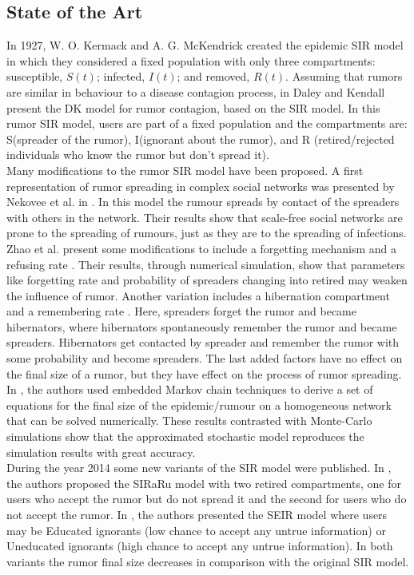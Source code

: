 \subsection{State of the Art}

In 1927, W. O. Kermack and A. G. McKendrick created the epidemic SIR model in which they considered a fixed population with only three compartments: susceptible, $S(t)$; infected, $I(t)$; and removed, $R(t)$. Assuming that rumors are similar in behaviour to a disease contagion process, in \cite{daley1965stochastic,daley1964epidemics} Daley and Kendall present the DK model for rumor contagion, based on the SIR model. In this rumor SIR model, users are part of a fixed population and the compartments are: S(spreader of the rumor), I(ignorant about the rumor), and R (retired/rejected individuals who know the rumor but don't spread it).\\

Many modifications to the rumor SIR model have been proposed. 
A first representation of rumor spreading in complex social networks was presented by Nekovee et al. in \cite{moreno2004dynamics,nekovee2007theory}. In this model the rumour spreads by contact of the spreaders with others in the network. 
Their results show that scale-free social networks are prone to the spreading of rumours, just as they are to the spreading of infections. Zhao et al. present some modifications to include a forgetting mechanism \cite{zhao2011rumor} and a refusing rate \cite{zhao2013sir}.
Their results, through numerical simulation, show that parameters like forgetting rate and probability of spreaders changing into retired may weaken the influence of rumor. 
Another variation includes a hibernation compartment \cite{zhao2012sihr} and a remembering rate \cite{zhao2013rumor}. 
Here, spreaders forget the rumor and became hibernators, where hibernators spontaneously remember the rumor and became spreaders. 
Hibernators get contacted by spreader and remember the rumor with some probability and become spreaders. 
The last added factors have no effect on the final size of a rumor, but they have effect on the process of rumor spreading.\\
In \cite{isham2010stochastic}, the authors used embedded Markov chain techniques to derive a set of equations for the final size of the epidemic/rumour on a homogeneous network that can be solved numerically. These results contrasted with Monte-Carlo simulations show that the approximated stochastic model reproduces the simulation results with great accuracy.\\
During the year 2014 some new variants of the SIR model were published. 
In \cite{wang2014siraru}, the authors proposed the SIRaRu model with two retired compartments, one for users who accept the rumor but do not spread it and the second for users who do not accept the rumor. 
In \cite{afassinou2014analysis}, the authors presented the SEIR model where users may be Educated ignorants (low chance to accept any untrue information) or Uneducated ignorants (high chance to accept any untrue information). 
In both variants the rumor final size decreases in comparison with the original SIR model.
